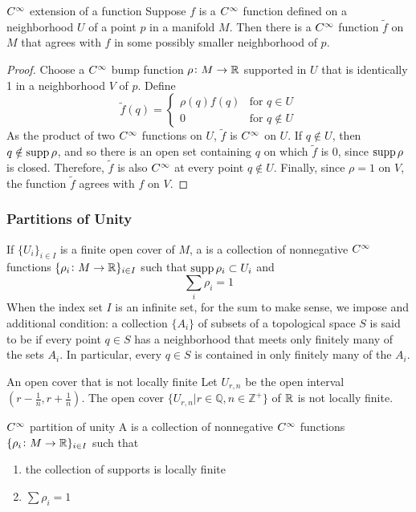 \begin{proposition}{\(C^\infty\) extension of a function}{}
    Suppose \(f\) is a \(C^\infty\) function defined on a neighborhood \(U\) of a point \(p\) in a manifold \(M\).
    Then there is a \(C^\infty\) function \(\tilde{f}\) on \(M\) that agrees with \(f\) in some possibly smaller neighborhood of \(p\).
\end{proposition}
\begin{proof}
    Choose a \(C^\infty\) bump function \(\rho \colon M \rightarrow \mathbb{R}\) supported in \(U\) that is identically 1 in a neighborhood \(V\) of \(p\).
    Define 
    \[
        \tilde{f}(q) = \begin{cases}
            \rho(q)f(q) & \text{for } q \in U \\ 
            0 & \text{for } q \notin U
        \end{cases}
    \]
    As the product of two \(C^\infty\) functions on \(U\), \(\tilde{f}\) is \(C^\infty\) on \(U\).
    If \(q \notin U\), then \(q \notin \operatorname{supp} \rho\), and so there is an open set containing \(q\) on which \(\tilde{f}\) is 0, since \(\operatorname{supp} \rho\) is closed.
    Therefore, \(\tilde{f}\) is also \(C^\infty\) at every point \(q \notin U\).
    Finally, since \(\rho = 1\) on \(V\), the function \(\tilde{f}\) agrees with \(f\) on \(V\).
\end{proof}

\subsubsection{Partitions of Unity}
 If \(\{U_i\}_{i \in I}\) is a finite open cover of \(M\), a  is a collection of nonnegative \(C^\infty\) functions \(\{\rho_i \colon M \rightarrow \mathbb{R}\}_{i \in I}\) such that \(\operatorname{supp} \rho_i \subset U_i\) and 
 \[
    \sum_i \rho_i =    1
 \]
 When the index set \(I\) is an infinite set, for the sum to make sense, we impose and additional  condition: a collection \(\{A_i\}\) of subsets of a topological space \(S\) is said to be  if every point \(q \in S\) has a neighborhood that meets only finitely many of the sets \(A_i\). In particular, every \(q \in S\) is contained in only finitely many of the \(A_i\).

 \begin{example}{An open cover that is not locally finite}{}
    Let \(U_{r,n}\) be the open interval \(\left( r - \frac{1}{n}, r + \frac{1}{n} \right)\).
    The open cover \(\{ U_{r,n} | r \in \mathbb{Q}, n \in \mathbb{Z}^+ \}\) of \(\mathbb{R}\) is not locally finite.
 \end{example}
 \begin{definition}{\(C^\infty\) partition of unity}{}
    A  is a collection of nonnegative \(C^\infty\) functions \(\{\rho_i \colon M \rightarrow \mathbb{R}\}_{i \in I}\) such that 
    \begin{enumerate}
        \item the collection of supports is locally finite
        \item \(\sum \rho_i = 1\)
    \end{enumerate}
 \end{definition}

